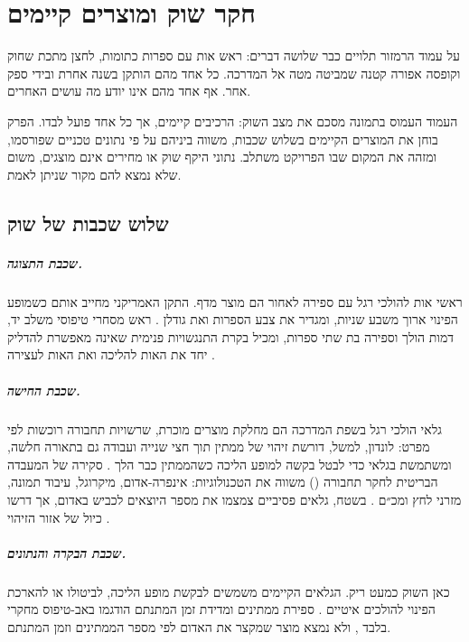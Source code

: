 \chapter{חקר שוק ומוצרים קיימים}\label{chap:market}
\begin{scenebox}
על עמוד הרמזור תלויים כבר שלושה דברים: ראש אות עם ספרות כתומות, לחצן מתכת שחוק וקופסה אפורה קטנה שמביטה מטה אל המדרכה.
כל אחד מהם הותקן בשנה אחרת ובידי ספק אחר. אף אחד מהם אינו יודע מה עושים האחרים.
\end{scenebox}

העמוד העמוס בתמונה מסכם את מצב השוק: הרכיבים קיימים, אך כל אחד פועל לבדו.
הפרק בוחן את המוצרים הקיימים בשלוש שכבות, משווה ביניהם על פי נתונים טכניים שפורסמו, ומזהה את המקום שבו הפרויקט משתלב.
נתוני היקף שוק או מחירים אינם מוצגים, משום שלא נמצא להם מקור שניתן לאמת.

\section{שלוש שכבות של שוק}
\paragraph{שכבת התצוגה.}
ראשי אות להולכי רגל עם ספירה לאחור הם מוצר מדף. התקן האמריקני מחייב אותם כשמופע הפינוי ארוך משבע שניות, ומגדיר את צבע הספרות ואת גודלן \cite{fhwa2025mutcd}. ראש מסחרי טיפוסי משלב יד, דמות הולך וספירה בת שתי ספרות, ומכיל בקרת התנגשויות פנימית שאינה מאפשרת להדליק יחד את האות להליכה ואת האות לעצירה \cite{current2023gtx}.

\paragraph{שכבת החישה.}
גלאי הולכי רגל בשפת המדרכה הם מחלקת מוצרים מוכרת, שרשויות תחבורה רוכשות לפי מפרט: לונדון, למשל, דורשת זיהוי של ממתין תוך חצי שנייה ועבודה גם בתאורה חלשה, ומשתמשת בגלאי כדי לבטל בקשה למופע הליכה כשהממתין כבר הלך \cite{tfl2015kerbside}.
סקירה של המעבדה הבריטית לחקר תחבורה () משווה את הטכנולוגיות: אינפרה-אדום, מיקרוגל, עיבוד תמונה, מזרני לחץ ומכ״ם \cite{trl2006ppr087}. בשטח, גלאים פסיביים צמצמו את מספר היוצאים לכביש באדום, אך דרשו כיול של אזור הזיהוי \cite{hughes2000}.

\paragraph{שכבת הבקרה והנתונים.}
כאן השוק כמעט ריק. הגלאים הקיימים משמשים לבקשת מופע הליכה, לביטולו או להארכת הפינוי להולכים איטיים \cite{hughes2000,tfl2015kerbside}. ספירת ממתינים ומדידת זמן המתנתם הודגמו באב-טיפוס מחקרי בלבד \cite{wickramasinghe2020}, ולא נמצא מוצר שמקצר את האדום לפי מספר הממתינים וזמן המתנתם.

